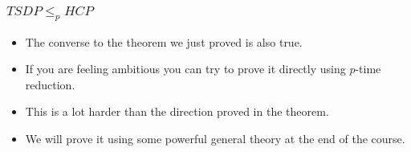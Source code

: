 \documentclass[handout]{beamer}
\begin{document}
\begin{frame}
\frametitle{$TSDP\leq_p HCP$}
\begin{itemize}
\item The converse to the theorem we just proved is also true. 
\vspace{0.5cm}
\item If you are feeling ambitious you can try to prove it directly using $p$-time reduction. 
\vspace{0.5cm}
\item This is a lot harder than the direction proved in the theorem. 
\vspace{0.5cm}
\item We will prove it using some powerful general theory at the end of the course.
\end{itemize}
\end{frame}
\end{document}
